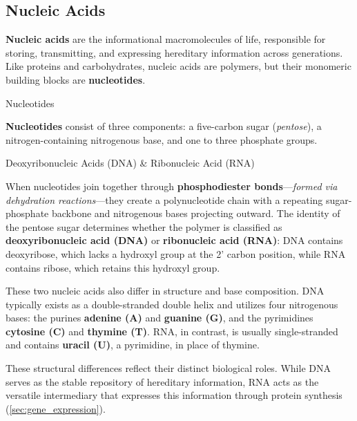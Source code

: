 \documentclass[10pt]{article}
\begin{document}
  \subsection{Nucleic Acids}

    \textbf{Nucleic acids} are the informational macromolecules of life, responsible for storing, transmitting, and expressing hereditary information across generations. Like proteins and carbohydrates, nucleic acids are polymers, but their monomeric building blocks are \textbf{nucleotides}.

    \begin{core}{Nucleotides}

      \textbf{Nucleotides} consist of three components: a five-carbon sugar (\textit{pentose}), a nitrogen-containing nitrogenous base, and one to three phosphate groups. 
      

    \end{core}

    \begin{core}{Deoxyribonucleic Acids (DNA) \& Ribonucleic Acid (RNA)}

      When nucleotides join together through \textbf{phosphodiester bonds}---\textit{formed via dehydration reactions}---they create a polynucleotide chain with a repeating sugar-phosphate backbone and nitrogenous bases projecting outward. The identity of the pentose sugar determines whether the polymer is classified as \textbf{deoxyribonucleic acid (DNA)} or \textbf{ribonucleic acid (RNA)}: DNA contains deoxyribose, which lacks a hydroxyl group at the 2' carbon position, while RNA contains ribose, which retains this hydroxyl group.


      These two nucleic acids also differ in structure and base composition. DNA typically exists as a double-stranded double helix and utilizes four nitrogenous bases: the purines \textbf{adenine (A)} and \textbf{guanine (G)}, and the pyrimidines \textbf{cytosine (C)} and \textbf{thymine (T)}. RNA, in contrast, is usually single-stranded and contains \textbf{uracil (U)}, a pyrimidine, in place of thymine.

      These structural differences reflect their distinct biological roles. While DNA serves as the stable repository of hereditary information, RNA acts as the versatile intermediary that expresses this information through protein synthesis (\autoref{sec:gene_expression}).

    \end{core}
\end{document}
